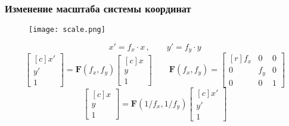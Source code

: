 \documentclass[
    12pt, 
    usepdftitle=false,
    aspectratio=1610
]{beamer}
\begin{document}
\begin{frame}
    \frametitle{Изменение масштаба системы координат}
    \begin{figure}[t]
        \texttt{[image: scale.png]}
    \end{figure}
    $$
        x' = f_x\cdot x\,,\qquad
        y' = f_y\cdot y
    $$
    $$
        \begin{bmatrix*}[c]
            x' \\ y' \\ 1    
        \end{bmatrix*}=
        \mathbf{F}(f_x,f_y)
        \begin{bmatrix*}[c]
            x \\ y \\ 1    
        \end{bmatrix*}
        \qquad
        \mathbf{F}(f_x,f_y)=
        \begin{bmatrix*}[r]
            f_x & 0 & 0 \\
            0 & f_y & 0 \\
            0 & 0 & 1
        \end{bmatrix*}
    $$
    $$
        \begin{bmatrix*}[c]
            x \\ y \\ 1    
        \end{bmatrix*}=
        \mathbf{F}(1/f_x,1/f_y)
        \begin{bmatrix*}[c]
            x' \\ y' \\ 1    
        \end{bmatrix*}
    $$
\end{frame}
\end{document}
